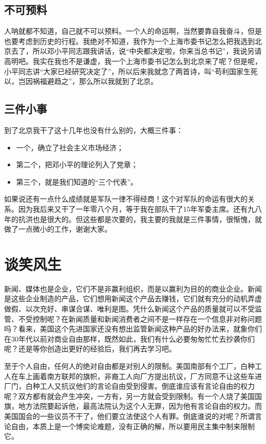 \section{不可预料}
人呐就都不知道，自己就不可以预料。一个人的命运啊，当然要靠自我奋斗，但是也要考虑到历史的行程。我绝对不知道，我作为一个上海市委书记怎么把我选到北京去了，所以邓小平同志跟我讲话，说“中央都决定啦，你来当总书记”，我说另请高明吧。我实在我也不是谦虚，我一个上海市委书记怎么到北京来了呢？但是呢，小平同志讲“大家已经研究决定了”，所以后来我就念了两首诗，叫“苟利国家生死以，岂因祸福避趋之”，那么所以我就到了北京。

\section{三件小事}
到了北京我干了这十几年也没有什么别的，大概三件事：

\begin{itemize}
	\item 一个，确立了社会主义市场经济；
	\item 第二个，把邓小平的理论列入了党章；
	\item 第三个，就是我们知道的“三个代表”。
\end{itemize}

如果说还有一点什么成绩就是军队一律不得经商！这个对军队的命运有很大的关系。因为我后来又干了一年零八个月，等于我在部队干了15年军委主席。还有九八年的抗洪也是很大的。但这些都是次要的，我主要的我就是三件事情，很惭愧，就做了一点微小的工作，谢谢大家。



\chapter{谈笑风生}
新闻、媒体也是企业，它们不是非赢利组织，而是以赢利为目的的商业企业。新闻是这些企业制造的产品，它们想用新闻这个产品去赚钱，它们就有充分的动机弄虚做假、以次充好、串谋合谋、唯利是图。凭什么新闻这个产品的质量就可以不受监管、不受控制呢？在新闻质量和新闻消费者之间不是一样存在一个信息非对称问题吗？看来，美国这个先进国家还没有想出监管新闻这种产品的好办法来，就象你们在30年代以前对商业自由那样，既然如此，我们有什么必要匆匆忙忙去抄袭你们呢？还是等你创造出更好的经验后，我们再去学习吧。

至于个人自由，任何人的绝对自由都是对别人的限制。美国南部有个工厂，白种工人在车上画着南方联邦的旗帜，非裔工人向厂方提出抗议，厂方同意不让这些车进厂门，白种工人又抗议他们的言论自由受到侵害。倒底谁应该有言论自由的权力呢？双方都有就会产生冲突，一方有，另一方就会受到限制。有一个人烧了美国国旗，地方法院要起诉他，最高法院认为这个人无罪，因为他有言论自由的权力。而美国国会的一些议员不干了，他们要立法使这个人有罪。倒底谁说的对呢？所谓言论自由，本质上是一个博奕论难题，没有正确的解，所以要用民主集中制来限制它。

